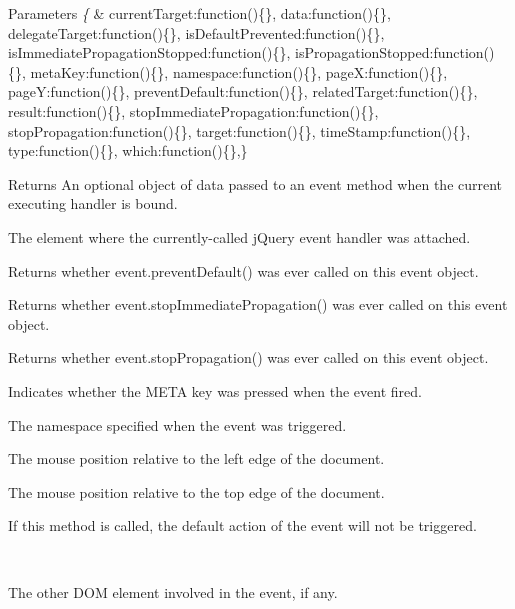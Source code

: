 \begin{DoxyParams}{Parameters}
{\em \{} & \textquotesingle{}current\+Target\textquotesingle{}\+:function()\{\}, \textquotesingle{}data\textquotesingle{}\+:function()\{\}, \textquotesingle{}delegate\+Target\textquotesingle{}\+:function()\{\}, \textquotesingle{}is\+Default\+Prevented\textquotesingle{}\+:function()\{\}, \textquotesingle{}is\+Immediate\+Propagation\+Stopped\textquotesingle{}\+:function()\{\}, \textquotesingle{}is\+Propagation\+Stopped\textquotesingle{}\+:function()\{\}, \textquotesingle{}meta\+Key\textquotesingle{}\+:function()\{\}, \textquotesingle{}namespace\textquotesingle{}\+:function()\{\}, \textquotesingle{}pageX\textquotesingle{}\+:function()\{\}, \textquotesingle{}pageY\textquotesingle{}\+:function()\{\}, \textquotesingle{}prevent\+Default\textquotesingle{}\+:function()\{\}, \textquotesingle{}related\+Target\textquotesingle{}\+:function()\{\}, \textquotesingle{}result\textquotesingle{}\+:function()\{\}, \textquotesingle{}stop\+Immediate\+Propagation\textquotesingle{}\+:function()\{\}, \textquotesingle{}stop\+Propagation\textquotesingle{}\+:function()\{\}, \textquotesingle{}target\textquotesingle{}\+:function()\{\}, \textquotesingle{}time\+Stamp\textquotesingle{}\+:function()\{\}, \textquotesingle{}type\textquotesingle{}\+:function()\{\}, \textquotesingle{}which\textquotesingle{}\+:function()\{\},\} \begin{DoxyReturn}{Returns}
An optional object of data passed to an event method when the current executing handler is bound.

The element where the currently-\/called j\+Query event handler was attached.

Returns whether event.\+prevent\+Default() was ever called on this event object.

Returns whether event.\+stop\+Immediate\+Propagation() was ever called on this event object.

Returns whether event.\+stop\+Propagation() was ever called on this event object.

Indicates whether the M\+E\+TA key was pressed when the event fired.

The namespace specified when the event was triggered.

The mouse position relative to the left edge of the document.

The mouse position relative to the top edge of the document.

If this method is called, the default action of the event will not be triggered.
\end{DoxyReturn}
\\
\hline
\end{DoxyParams}
The other D\+OM element involved in the event, if any.

